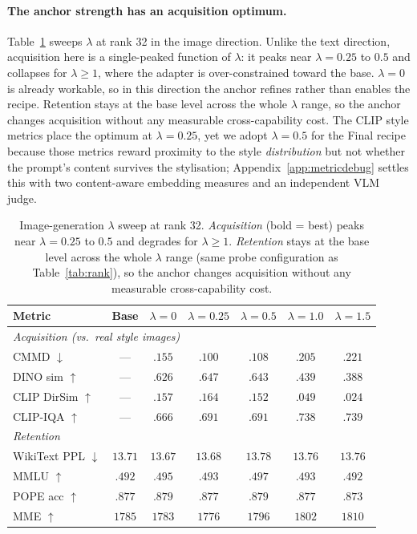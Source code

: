 \paragraph{The anchor strength has an acquisition optimum.}
Table~\ref{tab:klimg} sweeps $\lambda$ at rank 32 in the image direction. Unlike
the text direction, acquisition here is a single-peaked function of $\lambda$: it
peaks near $\lambda{=}0.25$ to $0.5$ and collapses for $\lambda\!\geq\!1$, where
the adapter is over-constrained toward the base. $\lambda{=}0$ is already
workable, so in this direction the anchor refines rather than enables the recipe.
Retention stays at the base level across the whole $\lambda$ range, so the anchor
changes acquisition without any measurable cross-capability cost. The CLIP style
metrics place the optimum at $\lambda{=}0.25$, yet we adopt $\lambda{=}0.5$ for
the Final recipe because those metrics reward proximity to the style
\emph{distribution} but not whether the prompt's content survives the
stylisation; Appendix~\ref{app:metricdebug} settles this with two content-aware
embedding measures and an independent VLM judge.

\begin{table}[t]
\centering\small
\setlength{\tabcolsep}{6pt}
\begin{tabular}{lcccccc}
\toprule
Metric & Base & $\lambda{=}0$ & $\lambda{=}0.25$ & $\lambda{=}0.5$ & $\lambda{=}1.0$ & $\lambda{=}1.5$ \\
\midrule
\multicolumn{7}{l}{\textit{Acquisition (vs.\ real style images)}}\\
CMMD $\downarrow$      & --- & $.155$ & $\mathbf{.100}$ & $.108$ & $.205$ & $.221$ \\
DINO sim $\uparrow$    & --- & $.626$ & $\mathbf{.647}$ & $.643$ & $.439$ & $.388$ \\
CLIP DirSim $\uparrow$ & --- & $.157$ & $\mathbf{.164}$ & $.152$ & $.049$ & $.024$ \\
CLIP-IQA $\uparrow$    & --- & $.666$ & $.691$ & $.691$ & $.738$ & $\mathbf{.739}$ \\
\midrule
\multicolumn{7}{l}{\textit{Retention}}\\
WikiText PPL $\downarrow$ & $13.71$ & $13.67$ & $13.68$ & $13.78$ & $13.76$ & $13.76$ \\
MMLU $\uparrow$           & $.492$ & $.495$ & $.493$ & $.497$ & $.493$ & $.492$ \\
POPE acc $\uparrow$       & $.877$ & $.879$ & $.877$ & $.879$ & $.877$ & $.873$ \\
MME $\uparrow$            & $1785$ & $1783$ & $1776$ & $1796$ & $1802$ & $1810$ \\
\bottomrule
\end{tabular}
\caption{Image-generation $\lambda$ sweep at rank 32. \textit{Acquisition} (bold
= best) peaks near $\lambda{=}0.25$ to $0.5$ and degrades for
$\lambda\!\geq\!1$. \textit{Retention} stays at the base level across the whole
$\lambda$ range (same probe configuration as Table~\ref{tab:rank}), so the anchor
changes acquisition without any measurable cross-capability cost.}
\label{tab:klimg}
\end{table}

